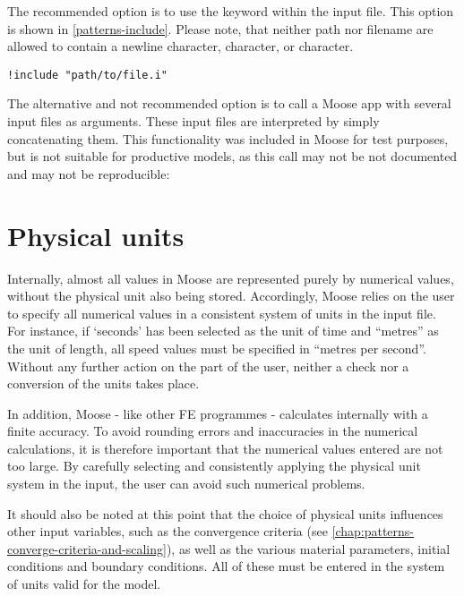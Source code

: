 The recommended option is to use the  keyword within the
input file. This option is shown in \autoref{patterns-include}. Please note,
that neither path nor filename are allowed to contain a newline character,
\codeword{#} character, or \codeword{[} character.

\begin{lstlisting}[language=Moose, caption={Include another input file},label={patterns-include}]
!include "path/to/file.i"
\end{lstlisting}

The alternative and not recommended option is to call a Moose app with several
input files as arguments. These input files are interpreted by simply
concatenating them. This functionality was included in Moose for test purposes,
but is not suitable for productive models, as this call may not be not
documented and may not be reproducible:


\section{Physical units}
\label{chap:patterns-physical-units}

Internally, almost all values in Moose are represented purely by numerical
values, without the physical unit also being stored. Accordingly, Moose relies
on the user to specify all numerical values in a consistent system of units in
the input file. For instance, if ‘seconds’ has been selected as the unit of
time and “metres” as the unit of length, all speed values must be specified in
“metres per second”. Without any further action on the part of the user,
neither a check nor a conversion of the units takes place.

In addition, Moose - like other FE programmes - calculates internally with a
finite accuracy. To avoid rounding errors and inaccuracies in the numerical
calculations, it is therefore important that the numerical values entered are
not too large. By carefully selecting and consistently applying the physical
unit system in the input, the user can avoid such numerical problems.

It should also be noted at this point that the choice of physical units
influences other input variables, such as the convergence criteria (see
\autoref{chap:patterns-converge-criteria-and-scaling}), as well as the various
material parameters, initial conditions and boundary conditions. All of these
must be entered in the system of units valid for the model.

